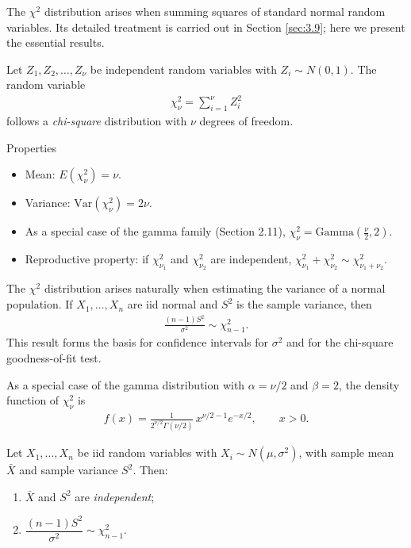 The $\chi^2$ distribution arises when summing squares of standard normal random variables. Its detailed treatment is carried out in Section \ref{sec:3.9}; here we present the essential results.

\begin{definicion}
Let $Z_1, Z_2, \ldots, Z_\nu$ be independent random variables with $Z_i \sim N(0,1)$. The random variable
\begin{align}
 \label{eq:3.2.11}
 \chi^2_\nu = \sum_{i=1}^\nu Z_i^2
\end{align}
follows a \emph{chi-square} distribution with $\nu$ degrees of freedom.
\end{definicion}

{Properties}
\begin{itemize}
 \item Mean: $E(\chi^2_\nu) = \nu$.
 \item Variance: $\text{Var}(\chi^2_\nu) = 2\nu$.
 \item As a special case of the gamma family (Section 2.11), $\chi^2_\nu = \text{Gamma}\!\left(\frac{\nu}{2}, 2\right)$.
 \item Reproductive property: if $\chi^2_{\nu_1}$ and $\chi^2_{\nu_2}$ are independent, $\chi^2_{\nu_1} + \chi^2_{\nu_2} \sim \chi^2_{\nu_1 + \nu_2}$.
\end{itemize}

\begin{observacion}
The $\chi^2$ distribution arises naturally when estimating the variance of a normal population. If $X_1, \ldots, X_n$ are iid normal and $S^2$ is the sample variance, then
\begin{align}
 \frac{(n-1)S^2}{\sigma^2} \sim \chi^2_{n-1}.
\end{align}
This result forms the basis for confidence intervals for $\sigma^2$ and for the chi-square goodness-of-fit test.
\end{observacion}

\begin{definicion}
 \label{eq:5.3.1}
As a special case of the gamma distribution with $\alpha=\nu/2$ and $\beta=2$, the density function of $\chi^2_\nu$ is
\begin{align}
 f(x) = \frac{1}{2^{\nu/2}\Gamma(\nu/2)}\,x^{\nu/2-1}e^{-x/2}, \qquad x > 0.
\end{align}
\end{definicion}

\begin{teorema}
 \label{eq:5.3.2}
Let $X_1, \ldots, X_n$ be iid random variables with $X_i \sim N(\mu, \sigma^2)$, with sample mean $\bar{X}$ and sample variance $S^2$. Then:
\begin{enumerate}
 \item $\bar{X}$ and $S^2$ are \emph{independent};
 \item $\dfrac{(n-1)S^2}{\sigma^2} \sim \chi^2_{n-1}$.
\end{enumerate}
\end{teorema}

